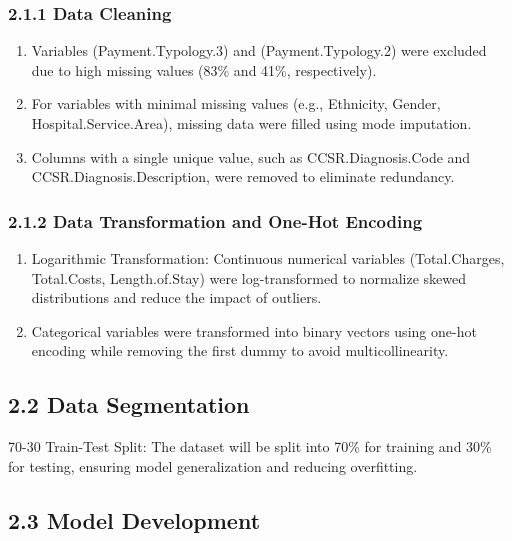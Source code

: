 \documentclass[
  10pt,
]{article}
\begin{document}
\subsubsection{2.1.1 Data Cleaning}\label{data-cleaning}

\begin{enumerate}
\def\labelenumi{(\arabic{enumi})}
\item
  Variables (Payment.Typology.3) and (Payment.Typology.2) were excluded
  due to high missing values (83\% and 41\%, respectively).
\item
  For variables with minimal missing values (e.g., Ethnicity, Gender,
  Hospital.Service.Area), missing data were filled using mode
  imputation.
\item
  Columns with a single unique value, such as CCSR.Diagnosis.Code and
  CCSR.Diagnosis.Description, were removed to eliminate redundancy.
\end{enumerate}

\subsubsection{2.1.2 Data Transformation and One-Hot
Encoding}\label{data-transformation-and-one-hot-encoding}

\begin{enumerate}
\def\labelenumi{(\arabic{enumi})}
\item
  Logarithmic Transformation: Continuous numerical variables
  (Total.Charges, Total.Costs, Length.of.Stay) were log-transformed to
  normalize skewed distributions and reduce the impact of outliers.
\item
  Categorical variables were transformed into binary vectors using
  one-hot encoding while removing the first dummy to avoid
  multicollinearity.
\end{enumerate}

\subsection{2.2 Data Segmentation}\label{data-segmentation}

70-30 Train-Test Split: The dataset will be split into 70\% for training
and 30\% for testing, ensuring model generalization and reducing
overfitting.

\subsection{2.3 Model Development}\label{model-development}
\end{document}
